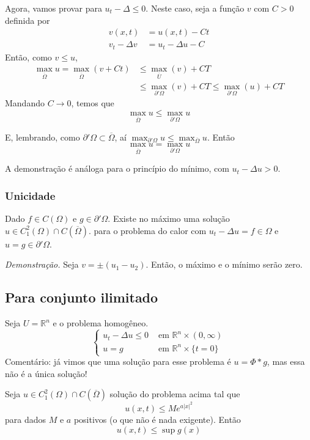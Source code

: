 \documentclass[11pt]{article}
\newcommand{\Rn}{{\mathbb{R}^n}}
\newcommand{\p}{\partial}
\begin{document}
Agora, vamos provar para \(u_t-\Delta \leq 0 \). Neste caso, seja a função \(v\) com \(C>0\) definida por \begin{align*}
	v(x,t) &= u(x,t) - Ct \\ v_t - \Delta v &= u_t - \Delta u - C
\end{align*} Então, como \(v\leq u\), \begin{align*}
\max_{\overline{\Omega}} u = \max_{\overline{\Omega}}(v+Ct) &\leq \max_{\overline{U}}(v) + CT \\
&\leq \max_{\p'\Omega}(v) + CT \leq \max_{\p'\Omega}(u) + CT 
\end{align*}
Mandando \(C\rightarrow 0 \), temos que \[\max_{\overline{\Omega}}u  \leq \max_{\p'\Omega} u\]

E, lembrando, como \( \p'\Omega \subset \overline{\Omega} \), aí \(\max_{\p'\Omega}u \leq \max_{\overline{\Omega}}u\). Então \[\max_{\overline{\Omega}}u  = \max_{\p'\Omega} u\]



A demonstração é análoga para o princípio do mínimo, com \(u_t - \Delta u > 0 \).

\subsubsection*{Unicidade}

Dado \(f \in C(\Omega)\) e \(g \in \p'\Omega\). Existe no máximo uma solução \(u\in C^2_1(\Omega) \cap C(\overline{\Omega})\). para o problema do calor com \(u_t -\Delta u =f \in \Omega\) e \(u=g \in \p'\Omega\).

\textit{Demonstração.} Seja \(v=\pm (u_1 - u_2)\). Então, o máximo e o mínimo serão zero.

\subsection{Para conjunto ilimitado}

Seja \(U=\Rn\) e o problema homogêneo. \[\begin{cases}
	u_t - \Delta u \leq 0 & \text{ em } \Rn \times(0,\infty) \\
	u= g & \text{ em } \Rn \times \{t=0\}
\end{cases}\] Comentário: já vimos que uma solução para esse problema é \(u=\Phi * g\), mas essa não é a única solução!

Seja \(u\in C^2_1(\Omega) \cap C(\overline{\Omega})\) solução do problema acima tal que  \[u(x,t) \leq M e^{a |x|^2}\] para dados \(M\) e \(a\) positivos (o que não é nada exigente). Então \[u(x,t)\leq \sup g(x)\]
\end{document}
